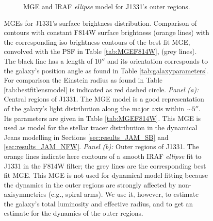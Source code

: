 \documentclass[useAMS,usenatbib]{mnras}
\begin{document}
\begin{figure}
\begin{subfigure}{.5\textwidth}
  \caption{MGE and IRAF \emph{ellipse} model for J1331's outer regions.}
 \label{fig:MGEouterRegions}
\end{subfigure}%
\caption{MGEs for J1331's surface brightness distribution. Comparison of contours with constant F814W surface brightness (orange lines) with the corresponding iso-brightness contours of the best fit MGE, convolved with the PSF in Table \ref{tab:MGEF814W}, (grey lines). The black line has a length of $10''$ and its orientation corresponds to the galaxy's position angle as found in Table \ref{tab:galaxyparameters}. For comparison the Einstein radius as found in Table \ref{tab:bestfitlensmodel}  is indicated as red dashed circle. \emph{Panel (a):} Central regions of J1331. The MGE model is a good representation of the galaxy's light distribution along the major axis within $\sim 5''$. Its parameters are given in Table \ref{tab:MGEF814W}. This MGE is used as model for the stellar tracer distribution in the dynamical Jeans modelling in Sections \ref{sec:results_JAM_SB} and \ref{sec:results_JAM_NFW}. \emph{Panel (b):} Outer regions of J1331. The orange lines indicate here contours of a smooth IRAF \emph{ellipse} fit to J1331 in the F814W filter; the grey lines are the corresponding best fit MGE. This MGE is not used for dynamical model fitting because the dynamics in the outer regions are strongly affected by non-axisymmetries (e.g., spiral arms). We use it, however, to estimate the galaxy's total luminosity and effective radius, and to get an estimate for the dynamics of the outer regions.}
\end{figure}
\end{document}
